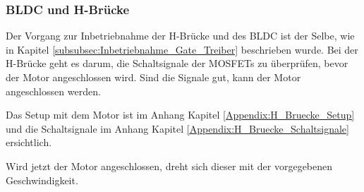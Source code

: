 \subsubsection{BLDC und H-Brücke}
\label{subsubsec:Inbetriebnahme_BLDC_und_H-Brücke}

Der Vorgang zur Inbetriebnahme der H-Brücke und des BLDC ist der Selbe, wie in Kapitel \ref{subsubsec:Inbetriebnahme_Gate_Treiber} beschrieben wurde. Bei der H-Brücke geht es darum, die Schaltsignale der MOSFETs zu überprüfen, bevor der Motor angeschlossen wird. Sind die Signale gut, kann der Motor angeschlossen werden.

Das Setup mit dem Motor ist im Anhang Kapitel \ref{Appendix:H_Bruecke_Setup} und die Schaltsignale im Anhang Kapitel \ref{Appendix:H_Bruecke_Schaltsignale} ersichtlich.

Wird jetzt der Motor angeschlossen, dreht sich dieser mit der vorgegebenen Geschwindigkeit.